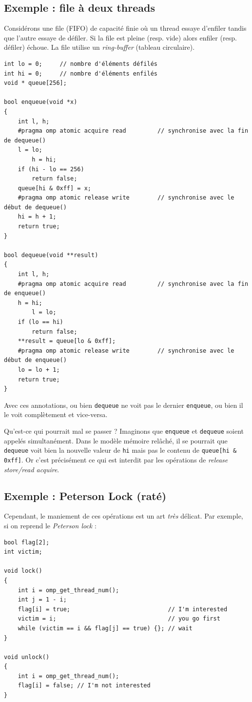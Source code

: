 \subsection{Exemple : file à deux threads} Considérons une file (FIFO) de capacité finie où
un thread essaye d'enfiler tandis que l'autre essaye de défiler. Si la file est
pleine (resp. vide) alors enfiler (resp. défiler) échoue. La file utilise un
\emph{ring-buffer} (tableau circulaire). 

\begin{verbatim}
int lo = 0;     // nombre d'éléments défilés
int hi = 0;     // nombre d'éléments enfilés
void * queue[256];

bool enqueue(void *x) 
{
	int l, h;
	#pragma omp atomic acquire read         // synchronise avec la fin de dequeue()
	l = lo;
        h = hi;
	if (hi - lo == 256)
		return false;
	queue[hi & 0xff] = x;
	#pragma omp atomic release write        // synchronise avec le début de dequeue()
	hi = h + 1;
	return true;
}

bool dequeue(void **result) 
{
	int l, h;
	#pragma omp atomic acquire read         // synchronise avec la fin de enqueue()
	h = hi;
        l = lo;
	if (lo == hi)
		return false;
	**result = queue[lo & 0xff];
	#pragma omp atomic release write        // synchronise avec le début de enqueue()
	lo = lo + 1;
	return true;
}
\end{verbatim}

Avec ces annotations, ou bien \texttt{dequeue} ne \og voit pas\fg{} le dernier
\texttt{enqueue}, ou bien il le voit complètement et vice-versa.

Qu'est-ce qui pourrait mal se passer ? Imaginons que \texttt{enqueue} et
\texttt{dequeue} soient appelés simultanément. Dans le modèle mémoire relâché,
il se pourrait que \texttt{dequeue} voit bien la nouvelle valeur de \texttt{hi}
mais pas le contenu de \texttt{queue[hi & 0xff]}. Or c'est précisément ce
qui est interdit par les opérations de \emph{release store/read acquire}.

\subsection{Exemple : Peterson Lock (raté)} Cependant, le maniement de ces opérations est un art
\emph{très} délicat. Par exemple, si on reprend le \emph{Peterson lock} :
\begin{myfilet}
\begin{verbatim}
bool flag[2];
int victim;

void lock() 
{
	int i = omp_get_thread_num();
	int j = 1 - i;
	flag[i] = true;                            // I'm interested
	victim = i;                                // you go first
	while (victim == i && flag[j] == true) {}; // wait
}

void unlock() 
{
	int i = omp_get_thread_num();
	flag[i] = false; // I'm not interested
}
\end{verbatim}
\end{myfilet}


